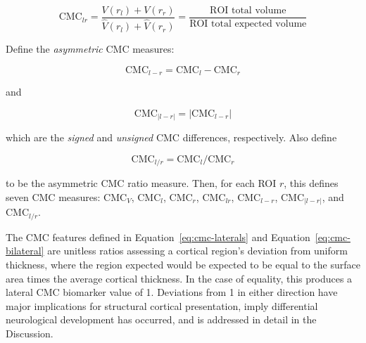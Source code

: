 \documentclass{article}
\begin{document}
\begin{equation} \label{eq:cmc-bilateral}
\text{CMC}_{lr}
=\frac{V(r_l) + V(r_r)}{\hat{V}(r_l) + \hat{V}(r_r)}
=\frac{\text{ROI total volume}}{\text{ROI total expected volume}}
\end{equation}

Define the \emph{asymmetric} CMC measures:

%

\begin{equation} \label{eq:asym-signed-diff}
\text{CMC}_{l - r} = \text{CMC}_{l} - \text{CMC}_{r}
\end{equation}

and

\begin{equation} \label{eq:asym-unsigned-diff}
\text{CMC}_{|l - r|} = \lvert\text{CMC}_{l - r} \rvert
\end{equation}

which are the \emph{signed} and \emph{unsigned} CMC differences, respectively. Also define

\begin{equation} \label{eq:asym-ratio}
\text{CMC}_{l / r} = \text{CMC}_{l} / \text{CMC}_{r}
\end{equation}

to be the asymmetric CMC ratio measure. Then, for each ROI \(r\), this
defines seven \(\text{CMC}\) measures: \(\text{CMC}_{V}\), \(\text{CMC}_l\),
\(\text{CMC}_r\), \(\text{CMC}_{lr}\), \(\text{CMC}_{l-r}\),
\(\text{CMC}_{\lvert l-r \rvert}\), and \(\text{CMC}_{l / r}\).


%
%

The CMC features defined in Equation~\ref{eq:cmc-laterals} and
Equation~\ref{eq:cmc-bilateral} are unitless ratios assessing a cortical
region's deviation from uniform thickness, where the region expected
would be expected to be equal to the surface area times the average cortical
thickness. In the case of equality, this produces a lateral CMC biomarker
value of 1. Deviations from 1 in either direction have major implications for
structural cortical presentation, imply differential neurological development
has occurred, and is addressed in detail in the Discussion.
\end{document}

